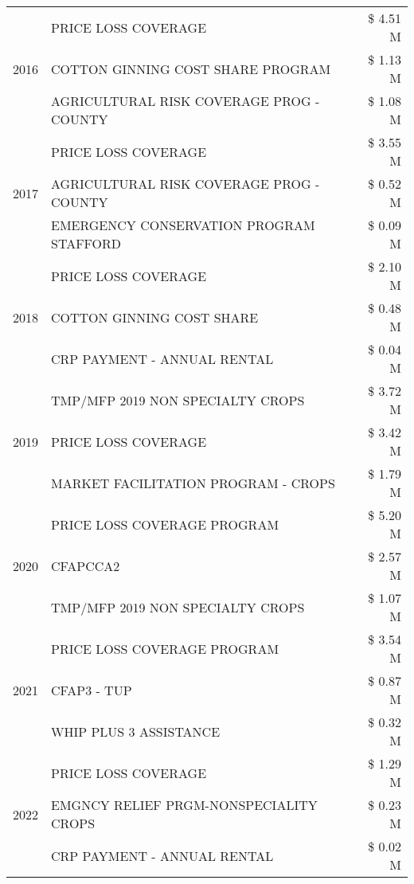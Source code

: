 \begin{tabular}{llr}
\cline{1-3}
\multirow[t]{3}{*}{2016} & PRICE LOSS COVERAGE & \$ 4.51 M \\
 & COTTON GINNING COST SHARE PROGRAM & \$ 1.13 M \\
 & AGRICULTURAL RISK COVERAGE PROG - COUNTY & \$ 1.08 M \\
\cline{1-3}
\multirow[t]{3}{*}{2017} & PRICE LOSS COVERAGE & \$ 3.55 M \\
 & AGRICULTURAL RISK COVERAGE PROG - COUNTY & \$ 0.52 M \\
 & EMERGENCY CONSERVATION PROGRAM STAFFORD & \$ 0.09 M \\
\cline{1-3}
\multirow[t]{3}{*}{2018} & PRICE LOSS COVERAGE & \$ 2.10 M \\
 & COTTON GINNING COST SHARE & \$ 0.48 M \\
 & CRP PAYMENT - ANNUAL RENTAL & \$ 0.04 M \\
\cline{1-3}
\multirow[t]{3}{*}{2019} & TMP/MFP 2019 NON SPECIALTY CROPS & \$ 3.72 M \\
 & PRICE LOSS COVERAGE & \$ 3.42 M \\
 & MARKET FACILITATION PROGRAM - CROPS & \$ 1.79 M \\
\cline{1-3}
\multirow[t]{3}{*}{2020} & PRICE LOSS COVERAGE PROGRAM & \$ 5.20 M \\
 & CFAPCCA2 & \$ 2.57 M \\
 & TMP/MFP 2019 NON SPECIALTY CROPS & \$ 1.07 M \\
\cline{1-3}
\multirow[t]{3}{*}{2021} & PRICE LOSS COVERAGE PROGRAM & \$ 3.54 M \\
 & CFAP3 - TUP & \$ 0.87 M \\
 & WHIP PLUS 3 ASSISTANCE & \$ 0.32 M \\
\cline{1-3}
\multirow[t]{3}{*}{2022} & PRICE LOSS COVERAGE & \$ 1.29 M \\
 & EMGNCY RELIEF PRGM-NONSPECIALITY CROPS & \$ 0.23 M \\
 & CRP PAYMENT - ANNUAL RENTAL & \$ 0.02 M \\
\cline{1-3}
\bottomrule
\end{tabular}
